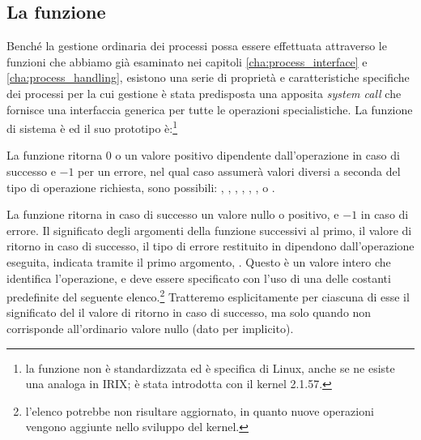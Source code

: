 \subsection{La funzione }
\label{sec:process_prctl}

Benché la gestione ordinaria dei processi possa essere effettuata attraverso
le funzioni che abbiamo già esaminato nei capitoli \ref{cha:process_interface}
e \ref{cha:process_handling}, esistono una serie di proprietà e
caratteristiche specifiche dei processi per la cui gestione è stata
predisposta una apposita \textit{system call} che fornisce una interfaccia
generica per tutte le operazioni specialistiche. La funzione di sistema è
 ed il suo prototipo è:\footnote{la funzione non è standardizzata
  ed è specifica di Linux, anche se ne esiste una analoga in IRIX; è stata
  introdotta con il kernel 2.1.57.}

\begin{funcproto}{ 
}

{La funzione ritorna $0$ o un valore positivo dipendente dall'operazione in
  caso di successo e $-1$ per un errore, nel qual caso  assumerà
  valori diversi a seconda del tipo di operazione richiesta, sono possibili:
  , , , ,
  , ,  o .}
\end{funcproto}

La funzione ritorna in caso di successo un valore nullo o positivo, e $-1$ in
caso di errore. Il significato degli argomenti della funzione successivi al
primo, il valore di ritorno in caso di successo, il tipo di errore restituito
in  dipendono dall'operazione eseguita, indicata tramite il primo
argomento, . Questo è un valore intero che identifica
l'operazione, e deve essere specificato con l'uso di una delle costanti
predefinite del seguente elenco.\footnote{l'elenco potrebbe non risultare
  aggiornato, in quanto nuove operazioni vengono aggiunte nello sviluppo del
  kernel.} Tratteremo esplicitamente per ciascuna di esse il significato del
il valore di ritorno in caso di successo, ma solo quando non corrisponde
all'ordinario valore nullo (dato per implicito).


